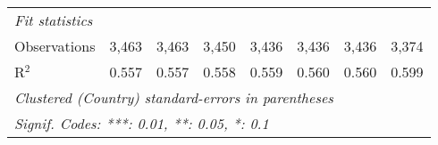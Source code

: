 \begin{tabular}{lccccccc}
   \midrule \emph{Fit statistics}\\
   Observations                                                     & 3,463          & 3,463          & 3,450          & 3,436          & 3,436          & 3,436          & 3,374\\  
   R$^2$                                                            & 0.557          & 0.557          & 0.558          & 0.559          & 0.560          & 0.560          & 0.599\\  
   \midrule
   \multicolumn{8}{l}{\emph{Clustered (Country) standard-errors in parentheses}}\\
   \multicolumn{8}{l}{\emph{Signif. Codes: ***: 0.01, **: 0.05, *: 0.1}}\\
\end{tabular}
\par\endgroup


